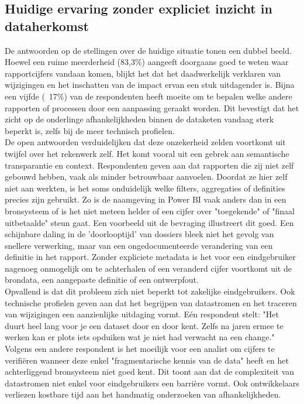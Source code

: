 \subsection{Huidige ervaring zonder expliciet inzicht in dataherkomst}

De antwoorden op de stellingen over de huidige situatie tonen een dubbel beeld. Hoewel een ruime meerderheid (83,3\%) aangeeft doorgaans goed te weten waar rapportcijfers vandaan komen, blijkt het dat het daadwerkelijk verklaren van wijzigingen en het inschatten van de impact ervan een stuk uitdagender is. Bijna een vijfde (~17\%) van de respondenten heeft moeite om te bepalen welke andere rapporten of processen door een aanpassing geraakt worden. Dit bevestigt dat het zicht op de onderlinge afhankelijkheden binnen de dataketen vandaag sterk beperkt is, zelfs bij de meer technisch profielen.\\

De open antwoorden verduidelijken dat deze onzekerheid zelden voortkomt uit twijfel over het rekenwerk zelf. Het komt vooral uit een gebrek aan semantische transparantie en context. Respondenten geven aan dat rapporten die zij niet zelf gebouwd hebben, vaak als minder betrouwbaar aanvoelen. Doordat ze hier zelf niet aan werkten, is het soms onduidelijk welke filters, aggregaties of definities precies zijn gebruikt. Zo is de naamgeving in Power BI vaak anders dan in een bronsysteem of is het niet meteen helder of een cijfer over "toegekende" of "finaal uitbetaalde" steun gaat. Een voorbeeld uit de bevraging illustreert dit goed. Een schijnbare daling in de 'doorlooptijd' van dossiers bleek niet het gevolg van snellere verwerking, maar van een ongedocumenteerde verandering van een definitie in het rapport. Zonder expliciete metadata is het voor een eindgebruiker nagenoeg onmogelijk om te achterhalen of een veranderd cijfer voortkomt uit de brondata, een aangepaste definitie of een ontwerpfout.\\

Opvallend is dat dit probleem zich niet beperkt tot zakelijke eindgebruikers. Ook technische profielen geven aan dat het begrijpen van datastromen en het traceren van wijzigingen een aanzienlijke uitdaging vormt. Eén respondent stelt: "Het duurt heel lang voor je een dataset door en door kent. Zelfs na jaren ermee te werken kan er plots iets opduiken wat je niet had verwacht na een change." Volgens een andere respondent is het moeilijk voor een analist om cijfers te verifiëren wanneer deze enkel "fragmentarische kennis van de data" heeft en het achterliggend bronsysteem niet goed kent. Dit toont aan dat de complexiteit van datastromen niet enkel voor eindgebruikers een barrière vormt. Ook ontwikkelaars verliezen kostbare tijd aan het handmatig onderzoeken van afhankelijkheden.\\

